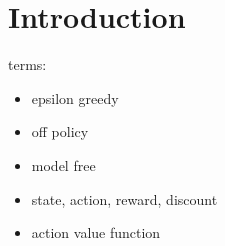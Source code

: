\section{Introduction}

terms:

\begin{itemize}
\item epsilon greedy
\item off policy
\item model free
\item state, action, reward, discount
\item action value function

\citep{mnih2013}



\end{itemize}